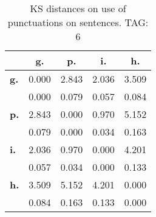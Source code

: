 \begin{table}[h!]
\begin{center}
\begin{tabular}{| l || c | c | c | c |}\hline
 & {\bf g.} & {\bf p.} & {\bf i.} & {\bf h.} \\\hline\hline
{\bf g.} & 0.000 & 2.843 & 2.036 & 3.509 \\
{\bf } & 0.000 & 0.079 & 0.057 & 0.084 \\\hline
{\bf p.} & 2.843 & 0.000 & 0.970 & 5.152 \\
{\bf } & 0.079 & 0.000 & 0.034 & 0.163 \\\hline
{\bf i.} & 2.036 & 0.970 & 0.000 & 4.201 \\
{\bf } & 0.057 & 0.034 & 0.000 & 0.133 \\\hline
{\bf h.} & 3.509 & 5.152 & 4.201 & 0.000 \\
{\bf } & 0.084 & 0.163 & 0.133 & 0.000 \\\hline
\end{tabular}
\caption{KS distances on use of punctuations on sentences. TAG: 6}
\end{center}
\end{table}